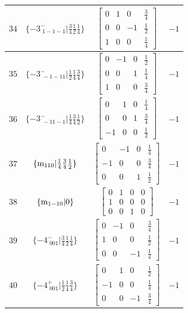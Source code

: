 \documentclass[fleqn,8pt]{jsarticle}
\begin{document}
\begin{longtable}{cccc}
$ 34 $ & $ \{-3^{-}_{\,\,1-1-1}|\frac{3}{4} \frac{1}{2} \frac{1}{4}\} $ & $ \begin{bmatrix} 0 & 1 & 0 & \frac{3}{4} \\ 0 & 0 & -1 & \frac{1}{2} \\ 1 & 0 & 0 & \frac{1}{4} \end{bmatrix} $ & $ -1 $ \\ \hline
$ 35 $ & $ \{-3^{-}_{\,\,-1-11}|\frac{1}{2} \frac{1}{4} \frac{3}{4}\} $ & $ \begin{bmatrix} 0 & -1 & 0 & \frac{1}{2} \\ 0 & 0 & 1 & \frac{1}{4} \\ 1 & 0 & 0 & \frac{3}{4} \end{bmatrix} $ & $ -1 $ \\ \hline
$ 36 $ & $ \{-3^{-}_{\,\,-11-1}|\frac{1}{4} \frac{3}{4} \frac{1}{2}\} $ & $ \begin{bmatrix} 0 & 1 & 0 & \frac{1}{4} \\ 0 & 0 & 1 & \frac{3}{4} \\ -1 & 0 & 0 & \frac{1}{2} \end{bmatrix} $ & $ -1 $ \\ \hline
$ 37 $ & $ \{{\rm m}_{110}|\frac{1}{4} \frac{3}{4} \frac{1}{2}\} $ & $ \begin{bmatrix} 0 & -1 & 0 & \frac{1}{4} \\ -1 & 0 & 0 & \frac{3}{4} \\ 0 & 0 & 1 & \frac{1}{2} \end{bmatrix} $ & $ -1 $ \\ \hline
$ 38 $ & $ \{{\rm m}_{1-10}|0\} $ & $ \begin{bmatrix} 0 & 1 & 0 & 0 \\ 1 & 0 & 0 & 0 \\ 0 & 0 & 1 & 0 \end{bmatrix} $ & $ -1 $ \\ \hline
$ 39 $ & $ \{-4^{-}_{\,\,001}|\frac{3}{4} \frac{1}{2} \frac{1}{4}\} $ & $ \begin{bmatrix} 0 & -1 & 0 & \frac{3}{4} \\ 1 & 0 & 0 & \frac{1}{2} \\ 0 & 0 & -1 & \frac{1}{4} \end{bmatrix} $ & $ -1 $ \\ \hline
$ 40 $ & $ \{-4^{+}_{\,\,001}|\frac{1}{2} \frac{1}{4} \frac{3}{4}\} $ & $ \begin{bmatrix} 0 & 1 & 0 & \frac{1}{2} \\ -1 & 0 & 0 & \frac{1}{4} \\ 0 & 0 & -1 & \frac{3}{4} \end{bmatrix} $ & $ -1 $ \\ \hline

\end{longtable}
\end{document}
